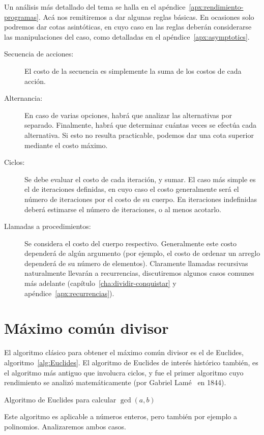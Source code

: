   Un análisis más detallado del tema
  se halla en el apéndice~\ref{apx:rendimiento-programas}.
  Acá nos remitiremos a dar algunas reglas básicas.
  En ocasiones solo podremos dar cotas asintóticas,
  en cuyo caso en las reglas deberán considerarse las manipulaciones del caso,
  como detalladas en el apéndice~\ref{apx:asymptotics}.
  \begin{description}
  \item[Secuencia de acciones:]
    El costo de la secuencia
    es simplemente la suma de los costos de cada acción.
  \item[Alternancia:]
    En caso de varias opciones,
    habrá que analizar las alternativas por separado.
    Finalmente,
    habrá que determinar cuántas veces se efectúa cada alternativa.
    Si esto no resulta practicable,
    podemos dar una cota superior mediante el costo máximo.
  \item[Ciclos:]
    Se debe evaluar el costo de cada iteración,
    y sumar.
    El caso más simple es el de iteraciones definidas,
    en cuyo caso el costo generalmente
    será el número de iteraciones por el costo de su cuerpo.
    En iteraciones indefinidas deberá estimarse el número de iteraciones,
    o al menos acotarlo.
  \item[Llamadas a procedimientos:]
    Se considera el costo del cuerpo respectivo.
    Generalmente este costo dependerá de algún argumento
    (por ejemplo,
     el costo de ordenar un arreglo dependerá de su número de elementos).
    Claramente llamadas recursivas naturalmente llevarán a recurrencias,
    discutiremos algunos casos comunes más adelante
    (capítulo~\ref{cha:dividir-conquistar}
     y apéndice~\ref{apx:recurrencias}).
  \end{description}

\section{Máximo común divisor}
\label{sec:GCD}

  El algoritmo clásico para obtener el máximo común divisor
  es el de Euclides,
  algoritmo~\ref{alg:Euclides}.
  El algoritmo de Euclides de interés histórico también,
  es el algoritmo más antiguo que involucra ciclos,
  y fue el primer algoritmo cuyo rendimiento se analizó matemáticamente
  (por Gabriel Lamé~%
    \cite{lame44:_gcd}
   en 1844).
  \begin{algorithm}[htbp]
    \DontPrintSemicolon\Indp

    \caption{Algoritmo de Euclides para calcular \(\gcd(a, b)\)}
    \label{alg:Euclides}
  \end{algorithm}
  Este algoritmo es aplicable a números enteros,
  pero también por ejemplo a polinomios.
  Analizaremos ambos casos.

